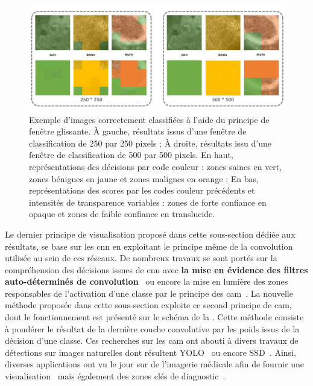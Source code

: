 \begin{figure}[H]
    \centering
    \includegraphics[width=\linewidth]{contents/chapter_6/resources/exemple_image_improvement_well.pdf}
    \caption{Exemple d'images correctement classifiées à l'aide du principe de fenêtre glissante. À gauche, résultats issus d'une fenêtre de classification de 250 par 250 pixels ; À droite, résultats issu d'une fenêtre de classification de 500 par 500 pixels. En haut, représentations des décisions par code couleur : zones saines en vert, zones bénignes en jaune et zones malignes en orange ; En bas, représentations des scores par les codes couleur précédents et intensités de transparence variables : zones de forte confiance en opaque et zones de faible confiance en translucide.}
    \label{fig:exemple_image_improvement_well}
\end{figure}\par

Le dernier principe de visualisation proposé dans cette sous-section dédiée aux résultats, se base sur les \gls{cnn} en exploitant le principe même de la convolution utilisée au sein de ces réseaux. De nombreux travaux se sont portés sur la compréhension des décisions issues de \gls{cnn} avec \textbf{la mise en évidence des filtres auto-déterminés de convolution}~\cite{Zeiler2014} ou encore la mise en lumière des zones responsables de l'activation d'une classe par le principe des \acrlong{cam}~\cite{Zhou2015}. La nouvelle méthode proposée dans cette sous-section exploite ce second principe de \gls{cam}, dont le fonctionnement est présenté sur le schéma de la . Cette méthode consiste à pondérer le résultat de la dernière couche convolutive par les poids issus de la décision d'une classe. Ces recherches sur les \gls{cam} ont abouti à divers travaux de détections sur images naturelles dont résultent YOLO~\cite{Redmon2016} ou encore SSD~\cite{Liu2016}. Ainsi, diverses applications ont vu le jour sur de l'imagerie médicale afin de fournir une visualisation~\cite{jia2017} mais également des zones clés de diagnostic~\cite{Park2019}.\par 
\clearpage

